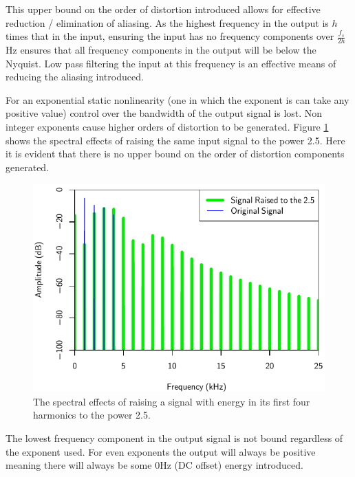 			This upper bound on the order of distortion introduced allows for effective reduction / elimination
			of aliasing. As the highest frequency in the output is $h$ times that in the input, ensuring the
			input has no frequency components over $\frac{f_{s}}{2h}$Hz ensures that all frequency components
			in the output will be below the Nyquist. Low pass filtering the input at this frequency is an
			effective means of reducing the aliasing introduced.

			For an exponential static nonlinearity (one in which the exponent is can take any positive value)
			control over the bandwidth of the output signal is lost. Non integer exponents cause higher orders
			of distortion to be generated. Figure \ref{fig:TwoAndAHalfSpectra} shows the spectral effects of
			raising the same input signal to the power 2.5. Here it is evident that there is no upper bound on
			the order of distortion components generated.

			\begin{figure}[h!]
				\centering
				\includegraphics{chapter5/Images/RaisedToTwoAndAHalfSpectra.pdf}
				\caption{The spectral effects of raising a signal with energy in its first four harmonics
					 to the power 2.5.}
				\label{fig:TwoAndAHalfSpectra}
			\end{figure}

			The lowest frequency component in the output signal is not bound regardless of the exponent used.
			For even exponents the output will always be positive meaning there will always be some 0Hz (DC
			offset) energy introduced.

